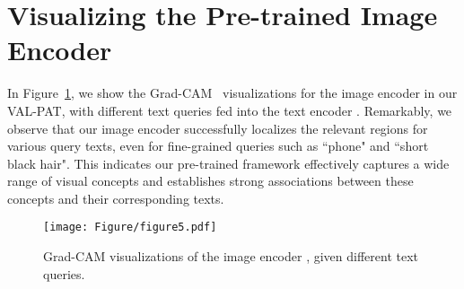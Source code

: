 \documentclass[final]{cvpr}
\begin{document}
\section{Visualizing the Pre-trained Image Encoder}
In Figure~\ref{app:fig2}, we show the Grad-CAM~\cite{selvaraju2017grad} visualizations for the image encoder  in our VAL-PAT, with different text queries fed into the text encoder .
Remarkably, we observe that our image encoder successfully localizes the relevant regions for various query texts, even for fine-grained queries such as ``phone" and ``short black hair".
This indicates our pre-trained framework effectively captures a wide range of visual concepts and establishes strong associations between these concepts and their corresponding texts. 
\begin{figure}[H]
	\centering
	\texttt{[image: Figure/figure5.pdf]}
	\caption{
		Grad-CAM visualizations of the image encoder , given different text queries.
	}
	\vspace{-2mm}
	\label{app:fig2} 
	\vspace{-2mm}
\end{figure}
\end{document}
